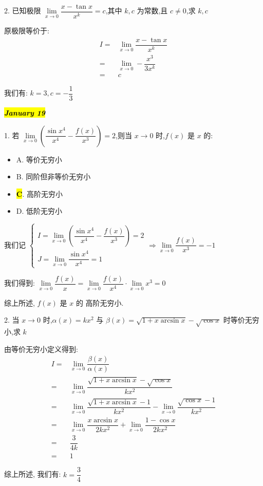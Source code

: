 2. 已知极限 $\lim\limits_{x\to 0}\dfrac{x-\tan x}{x^{k}}=c$,其中 $k,c$ 为常数,且 $c\neq 0$,求 $k,c$
\begin{solution}

	原极限等价于:
	\begin{align*}
		I = & \lim\limits_{x\to 0}\dfrac{x-\tan x}{x^{k}}\\
		  = & \lim\limits_{x\to 0}-\dfrac{x^{3}}{3x^{k}}\\
		  = & c
	\end{align*}

	我们有: $k = 3, c = -\dfrac{1}{3}$
\end{solution}

\hl{\textbf{\textit{January 19}}}

1. 若 $\lim\limits_{x\to 0}\left(\dfrac{\sin x^{4}}{x^{4}}-\dfrac{f(x)}{x^{3}}\right)=2$,则当 $x\to 0$ 时,$f(x)$ 是 $x$ 的:
\begin{itemize}
	\item A. 等价无穷小
	\item B. 同阶但非等价无穷小
	\item \hl{\textbf{C}}. 高阶无穷小
	\item D. 低阶无穷小
\end{itemize}
\begin{solution}

	我们记 
	$\begin{cases}
		I = \lim\limits_{x\to 0}\left(\dfrac{\sin x^{4}}{x^{4}}-\dfrac{f(x)}{x^{3}}\right) = 2\\
		J = \lim\limits_{x\to 0}\dfrac{\sin x^{4}}{x^{4}} = 1
	\end{cases}\Rightarrow \lim\limits_{x\to 0}\dfrac{f(x)}{x^{3}} = -1$

	我们得到: $\lim\limits_{x\to 0}\dfrac{f(x)}{x} = \lim\limits_{x\to 0}\dfrac{f(x)}{x^{4}}\cdot\lim\limits_{x\to 0}x^{3} = 0$

	综上所述, $f(x)$ 是 $x$ 的 高阶无穷小.
\end{solution}

2. 当 $x\to 0$ 时,$\alpha(x)=kx^{2}$ 与 $\beta(x)=\sqrt{1+x\arcsin x}-\sqrt{\cos x}$ 时等价无穷小,求 $k$
\begin{solution}

	由等价无穷小定义得到:
	\begin{align*}
		I = & \lim\limits_{x\to 0}\dfrac{\beta(x)}{\alpha(x)}\\
		  = & \lim\limits_{x\to 0}\dfrac{\sqrt{1+x\arcsin x}-\sqrt{\cos x}}{kx^{2}}\\
		  = & \lim\limits_{x\to 0}\dfrac{\sqrt{1+x\arcsin x}-1}{kx^{2}}-\lim\limits_{x\to 0}\dfrac{\sqrt{\cos x}-1}{kx^{2}}\\
		  = & \lim\limits_{x\to 0}\dfrac{x\arcsin x}{2kx^{2}}+\lim\limits_{x\to 0}\dfrac{1-\cos x}{2kx^{2}}\\
		  = & \dfrac{3}{4k}\\
		  = & 1
	\end{align*}

	综上所述, 我们有: $k = \dfrac{3}{4}$
\end{solution}

